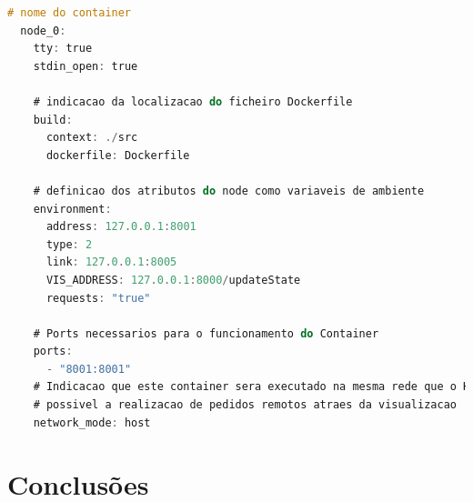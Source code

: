 \begin{lstlisting}[caption={Iteração pelo ``Map'' ``Nodes'', instanciação do objeto e adicionado à lista },language=C]
  # nome do container
  node_0:
    tty: true
    stdin_open: true

    # indicacao da localizacao do ficheiro Dockerfile
    build:
      context: ./src
      dockerfile: Dockerfile

    # definicao dos atributos do node como variaveis de ambiente
    environment:
      address: 127.0.0.1:8001
      type: 2 
      link: 127.0.0.1:8005
      VIS_ADDRESS: 127.0.0.1:8000/updateState
      requests: "true"

    # Ports necessarios para o funcionamento do Container
    ports:
      - "8001:8001"
    # Indicacao que este container sera executado na mesma rede que o Host, isto para que seja
    # possivel a realizacao de pedidos remotos atraes da visualizacao
    network_mode: host
\end{lstlisting}





\section{Conclusões}
